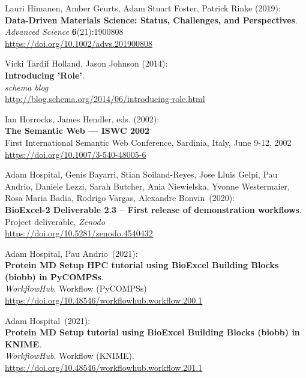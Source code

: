 \begin{thebibliography}{9}
Lauri Himanen, Amber Geurts, Adam Stuart Foster, Patrick Rinke (2019):\\
\textbf{Data-Driven Materials Science: Status, Challenges, and Perspectives}.\\
\emph{Advanced Science} \textbf{6}(21):1900808\\
\url{https://doi.org/10.1002/advs.201900808}

Vicki Tardif Holland, Jason Johnson (2014): \\
\textbf{Introducing '{Role}'}.\\
\emph{schema blog}\\
\url{http://blog.schema.org/2014/06/introducing-role.html}

Ian Horrocks, James Hendler, eds. (2002): \\
\textbf{The {Semantic Web} --- {ISWC} 2002} \\
First International Semantic Web Conference, Sardinia, Italy, June 9-12, 2002\\
\url{https://doi.org/10.1007/3-540-48005-6}

Adam Hospital, Genís Bayarri, Stian Soiland-Reyes, Jose Lluis
Gelpi, Pau Andrio, Daniele Lezzi, Sarah Butcher, Ania Niewielska, Yvonne
Westermaier, Rosa Maria Badia, Rodrigo Vargas, Alexandre Bonvin~(2020):\\
\textbf{BioExcel-2 Deliverable 2.3 -- First release of demonstration
workflows}.\\
Project deliverable, \emph{Zenodo}\\
\url{https://doi.org/10.5281/zenodo.4540432}

Adam Hospital, Pau Andrio~(2021):\\
\textbf{Protein MD Setup HPC tutorial using BioExcel Building Blocks
(biobb) in PyCOMPSs}.\\
\emph{WorkflowHub}. Workflow (PyCOMPSs)\\
\url{https://doi.org/10.48546/workflowhub.workflow.200.1}

Adam Hospital~(2021):\\
\textbf{Protein MD Setup tutorial using BioExcel Building Blocks (biobb)
in KNIME}.\\
\emph{WorkflowHub}. Workflow (KNIME).\\
\url{https://doi.org/10.48546/workflowhub.workflow.201.1}


\end{thebibliography}
